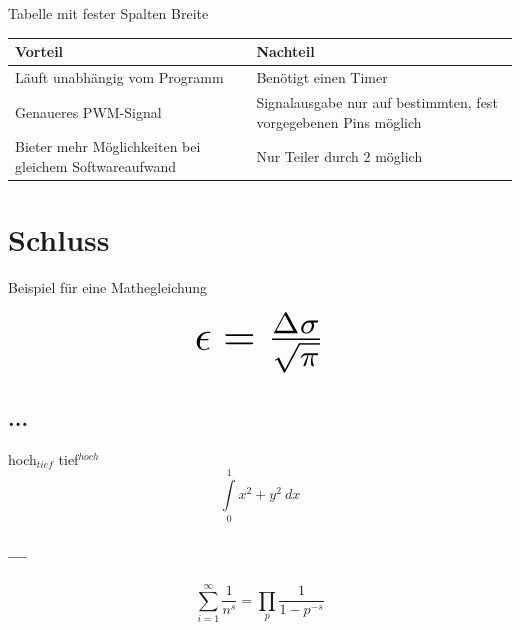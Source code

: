 \documentclass[a4paper, 12pt]{article}
\begin{document}
\subsubsection{~~}
Tabelle mit fester Spalten Breite

\bgroup
\def\arraystretch{1.5}
\begin{table}[!ht]
    \centering
    \begin{tabularx}{\textwidth}{X|X}
    Vorteil & Nachteil \\
    \hline
    Läuft unabhängig vom Programm & Benötigt einen Timer \\
    Genaueres PWM-Signal & Signalausgabe nur auf bestimmten, fest vorgegebenen Pins möglich\\
    Bieter mehr Möglichkeiten bei gleichem Softwareaufwand & Nur Teiler durch 2 möglich \\
    \end{tabularx}
    \label{tab:my_label}
\end{table}
\egroup

\newpage
\section{Schluss}
Beispiel für eine Mathegleichung

\begin{displaymath}
\scalebox{3}{$\epsilon = \frac{\Delta\sigma}{\sqrt{\pi}}$}
\end{displaymath}

\subsection{...}
hoch$_{tief}$ tief$^{hoch}$ 
\[ \int\limits_0^1 x^2 + y^2 \ dx \]

\subsubsection{---}
\[ \sum_{i=1}^{\infty} \frac{1}{n^s} = \prod_p \frac{1}{1 - p^{-s}} \]



\end{document}
